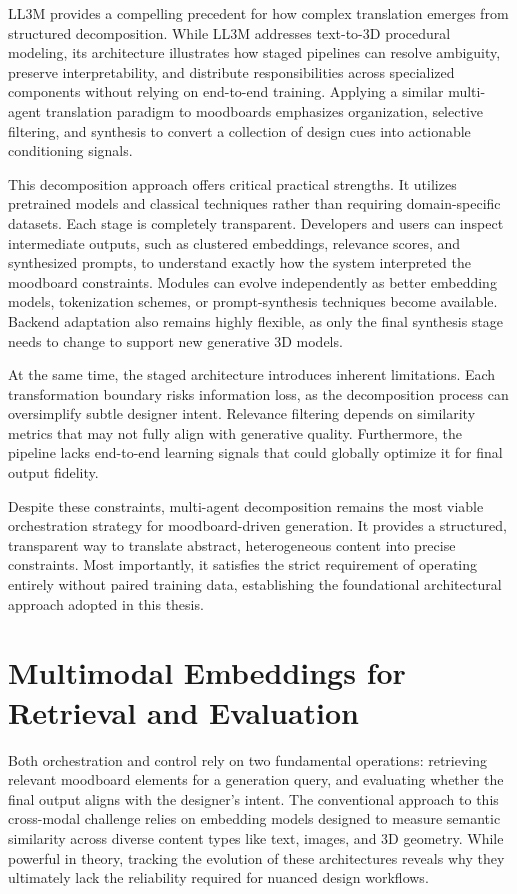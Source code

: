 LL3M \cite{lu2025ll3mlargelanguage3d} provides a compelling precedent for how complex translation emerges from structured decomposition. While LL3M addresses text-to-3D procedural modeling, its architecture illustrates how staged pipelines can resolve ambiguity, preserve interpretability, and distribute responsibilities across specialized components without relying on end-to-end training. Applying a similar multi-agent translation paradigm to moodboards emphasizes organization, selective filtering, and synthesis to convert a collection of design cues into actionable conditioning signals.

This decomposition approach offers critical practical strengths. It utilizes pretrained models and classical techniques rather than requiring domain-specific datasets. Each stage is completely transparent. Developers and users can inspect intermediate outputs, such as clustered embeddings, relevance scores, and synthesized prompts, to understand exactly how the system interpreted the moodboard constraints. Modules can evolve independently as better embedding models, tokenization schemes, or prompt-synthesis techniques become available. Backend adaptation also remains highly flexible, as only the final synthesis stage needs to change to support new generative 3D models.

At the same time, the staged architecture introduces inherent limitations. Each transformation boundary risks information loss, as the decomposition process can oversimplify subtle designer intent. Relevance filtering depends on similarity metrics that may not fully align with generative quality. Furthermore, the pipeline lacks end-to-end learning signals that could globally optimize it for final output fidelity.

Despite these constraints, multi-agent decomposition remains the most viable orchestration strategy for moodboard-driven generation. It provides a structured, transparent way to translate abstract, heterogeneous content into precise constraints. Most importantly, it satisfies the strict requirement of operating entirely without paired training data, establishing the foundational architectural approach adopted in this thesis.

\section{Multimodal Embeddings for Retrieval and Evaluation}

Both orchestration and control rely on two fundamental operations: retrieving relevant moodboard elements for a generation query, and evaluating whether the final output aligns with the designer's intent. The conventional approach to this cross-modal challenge relies on embedding models designed to measure semantic similarity across diverse content types like text, images, and 3D geometry. While powerful in theory, tracking the evolution of these architectures reveals why they ultimately lack the reliability required for nuanced design workflows.


